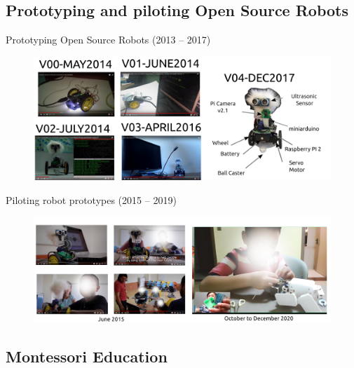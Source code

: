\subsection{Prototyping and piloting Open Source Robots}

{
\begin{frame}{Prototyping Open Source Robots (2013 -- 2017)}
      \begin{figure}
        \centering
        \includegraphics[width=1.0\textwidth]{./figures/air4children-a/outputs/drawing-v00.png}
      \end{figure}
\end{frame}
}

{
\begin{frame}{Piloting robot prototypes (2015 -- 2019)}
      \begin{figure}
        \centering
        \includegraphics[width=1.0\textwidth]{./figures/air4children-b/outputs/drawing-v00.png}
      \end{figure}
\end{frame}
}

\subsection{Montessori Education}


